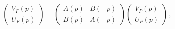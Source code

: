 \begin{equation*}
\left( 
\begin{array}{c}
V_{F}\left( p\right)  \\ 
U_{F}\left( p\right) 
\end{array}
\right) =\left( 
\begin{array}{cc}
A\left( p\right)  & B\left( -p\right)  \\ 
B\left( p\right)  & A\left( -p\right) 
\end{array}
\right) \left( 
\begin{array}{c}
V_{P}\left( p\right)  \\ 
U_{P}\left( p\right) 
\end{array}
\right) \,,
\end{equation*}

